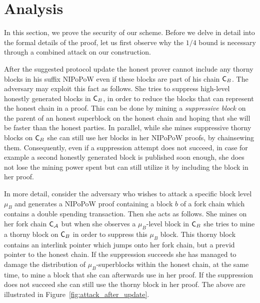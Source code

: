 \section{Analysis}
In this section, we prove the security of our scheme. Before we delve in detail into the formal
details of the proof, let us first observe why the $1/4$ bound is necessary through a combined attack
on our construction.

After the suggested protocol update the honest prover cannot include any thorny blocks in his suffix NIPoPoW even if these blocks are part of his chain $\mathsf{C}_B$. The adversary may exploit this fact as follows. She tries to suppress high-level honestly generated blocks in $\mathsf{C}_B$, in order to reduce the blocks that can represent the honest chain in a proof. This can be done by mining a \emph{suppressive block} on the parent of an honest superblock on the honest chain and hoping that she will be faster than the honest parties. In parallel, while she mines suppressive thorny blocks on $\mathsf{C}_B$ she can still use her blocks in her NIPoPoW proofs, by chainsewing them. Consequently, even if a suppression attempt does not succeed, in case for example a second honestly generated block is published soon enough, she does not lose the mining power spent but can still utilize it by including the block in her proof.

In more detail, consider the adversary who wishes to attack a specific block level $\mu_B$ and generates a NIPoPoW proof containing a block $b$ of a fork chain which contains a double spending transaction. Then she acts as follows. She mines on her fork chain $\mathsf{C}_\mathcal{A}$ but when she observes a $\mu_B$-level block in $\mathsf{C}_B$ she tries to mine a thorny block on $\mathsf{C}_B$ in order to suppress this $\mu_B$ block. This thorny block contains an interlink pointer which jumps onto her fork chain, but a previd pointer to the honest chain. If the suppression succeeds she has managed to damage the distribution of $\mu_B$-superblocks within the honest chain, at the same time, to mine a block that she can afterwards use in her proof. If the suppression does not succeed she can still use the thorny block in her proof. The above are illustrated in Figure~\ref{fig:attack_after_update}.

